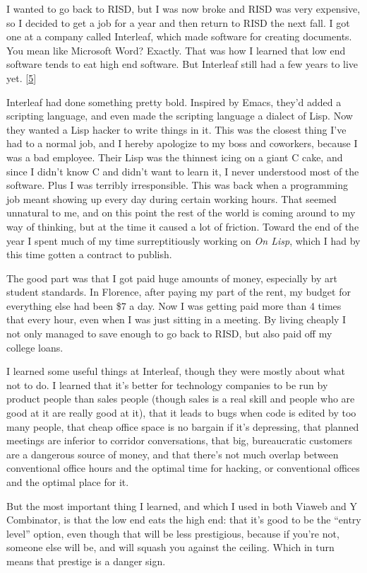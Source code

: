 I wanted to go back to RISD, but I was now broke and RISD was very
expensive, so I decided to get a job for a year and then return to RISD
the next fall. I got one at a company called Interleaf, which made
software for creating documents. You mean like Microsoft Word? Exactly.
That was how I learned that low end software tends to eat high end
software. But Interleaf still had a few years to live yet.
{[}\hyperref[f5n]{5}{]}

Interleaf had done something pretty bold. Inspired by Emacs, they'd
added a scripting language, and even made the scripting language a
dialect of Lisp. Now they wanted a Lisp hacker to write things in it.
This was the closest thing I've had to a normal job, and I hereby
apologize to my boss and coworkers, because I was a bad employee. Their
Lisp was the thinnest icing on a giant C cake, and since I didn't know C
and didn't want to learn it, I never understood most of the software.
Plus I was terribly irresponsible. This was back when a programming job
meant showing up every day during certain working hours. That seemed
unnatural to me, and on this point the rest of the world is coming
around to my way of thinking, but at the time it caused a lot of
friction. Toward the end of the year I spent much of my time
surreptitiously working on \emph{On Lisp}, which I had by this time
gotten a contract to publish.

The good part was that I got paid huge amounts of money, especially by
art student standards. In Florence, after paying my part of the rent, my
budget for everything else had been \$7 a day. Now I was getting paid
more than 4 times that every hour, even when I was just sitting in a
meeting. By living cheaply I not only managed to save enough to go back
to RISD, but also paid off my college loans.

I learned some useful things at Interleaf, though they were mostly about
what not to do. I learned that it's better for technology companies to
be run by product people than sales people (though sales is a real skill
and people who are good at it are really good at it), that it leads to
bugs when code is edited by too many people, that cheap office space is
no bargain if it's depressing, that planned meetings are inferior to
corridor conversations, that big, bureaucratic customers are a dangerous
source of money, and that there's not much overlap between conventional
office hours and the optimal time for hacking, or conventional offices
and the optimal place for it.

But the most important thing I learned, and which I used in both Viaweb
and Y Combinator, is that the low end eats the high end: that it's good
to be the ``entry level'' option, even though that will be less
prestigious, because if you're not, someone else will be, and will
squash you against the ceiling. Which in turn means that prestige is a
danger sign.

